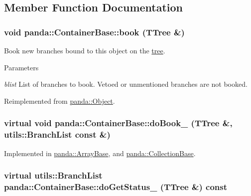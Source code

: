 \subsection{Member Function Documentation}
\hypertarget{classpanda_1_1ContainerBase_a940f2c42e10910ba3bc87369347cc97d}{
\subsubsection[{book}]{\setlength{\rightskip}{0pt plus 5cm}void panda::ContainerBase::book (TTree \&)}}
\label{classpanda_1_1ContainerBase_a940f2c42e10910ba3bc87369347cc97d}


Book new branches bound to this object on the \hyperlink{namespacepanda_1_1tree}{tree}. 
\begin{DoxyParams}{Parameters}
\item[{\em blist}]List of branches to book. Vetoed or unmentioned branches are not booked. \end{DoxyParams}


Reimplemented from \hyperlink{classpanda_1_1Object_a2fcd6665633deef16e86aa4e49135dd7}{panda::Object}.\hypertarget{classpanda_1_1ContainerBase_acb14a3b21278b32716445c846017b664}{
\subsubsection[{doBook\_\-}]{\setlength{\rightskip}{0pt plus 5cm}virtual void panda::ContainerBase::doBook\_\- (TTree \&, \/  {\bf utils::BranchList} const \&)}}
\label{classpanda_1_1ContainerBase_acb14a3b21278b32716445c846017b664}


Implemented in \hyperlink{classpanda_1_1ArrayBase_aecb9d88c88e0102d7c8d631a036cb338}{panda::ArrayBase}, and \hyperlink{classpanda_1_1CollectionBase_a55e90bbac83f59d93a938dbe57c871c0}{panda::CollectionBase}.\hypertarget{classpanda_1_1ContainerBase_a6aa05603a5aff914a56681ab70b01b4e}{
\subsubsection[{doGetStatus\_\-}]{\setlength{\rightskip}{0pt plus 5cm}virtual {\bf utils::BranchList} panda::ContainerBase::doGetStatus\_\- (TTree \&) const}}
\label{classpanda_1_1ContainerBase_a6aa05603a5aff914a56681ab70b01b4e}


